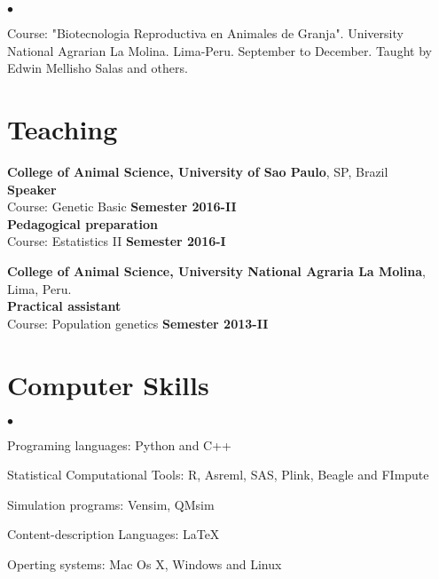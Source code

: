 \documentclass[margin,line,10pt]{res}
\newenvironment{list2}{
  \begin{list}{$\bullet$}{%
      \setlength{\itemsep}{0in}
      \setlength{\parsep}{0in} \setlength{\parskip}{0in}
      \setlength{\topsep}{0in} \setlength{\partopsep}{0in} 
      \setlength{\leftmargin}{0.2in}}}{\end{list}}
\begin{document}
\begin{resume}
\section{}

\begin{list2}
\item Course: "Biotecnologia Reproductiva en Animales de Granja". University National Agrarian La Molina. Lima-Peru. September to December.
Taught by Edwin Mellisho Salas and others.
\end{list2}  
\vspace{0.5cm}

\section{\sc Teaching}

{\bf College of Animal Science, University of Sao Paulo}, SP, Brazil\\
\textbf{Speaker}\\
Course: Genetic Basic     \hfill {\bf Semester 2016-II} \\
\textbf{Pedagogical preparation} \\
Course: Estatistics II     \hfill {\bf Semester 2016-I}\\
\vspace{0.5cm}

{\bf College of Animal Science, University National Agraria La Molina}, Lima, Peru.\\
\textbf{Practical assistant} \\
Course: Population genetics     \hfill {\bf Semester 2013-II} \\
\vspace{0.5cm}


\section{\sc Computer Skills} 
\begin{list2}
\item Programing languages: Python and C++
\vspace{0.3cm}
\item Statistical Computational Tools: R, Asreml, SAS, Plink, Beagle and FImpute
\vspace{0.3cm}
\item Simulation programs: Vensim, QMsim
\vspace{0.3cm}
\item Content-description Languages: \LaTeX
\vspace{0.3cm}
\item Operting systems: Mac Os X, Windows and Linux  
\end{list2}


\end{resume}
\end{document}

